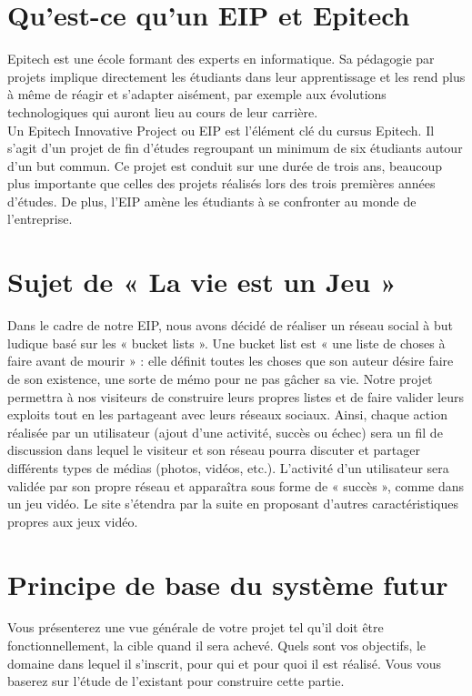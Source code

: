 \documentclass{life-fr}
\begin{document}
\section{Qu'est-ce qu'un EIP et Epitech}
Epitech est une école formant des experts en informatique. Sa pédagogie par projets implique directement les étudiants dans leur apprentissage et les rend plus à même de réagir et s'adapter aisément, par exemple aux évolutions technologiques qui auront lieu au cours de leur carrière.\\

Un Epitech Innovative Project ou EIP est l'élément clé du cursus Epitech. Il s'agit d'un projet de fin d'études regroupant un minimum de six étudiants autour d'un but commun. Ce projet est conduit sur une durée de trois ans, beaucoup plus importante que celles des projets réalisés lors des trois premières années d'études. De plus, l'EIP amène les étudiants à se confronter au monde de l'entreprise.

\section{Sujet de « La vie est un Jeu »}
Dans le cadre de notre EIP, nous avons décidé de réaliser un réseau social à but ludique basé sur les « bucket lists ». Une bucket list est « une liste de choses à faire avant de mourir » : elle définit toutes les choses que son auteur désire faire de son existence, une sorte de mémo pour ne pas gâcher sa vie. Notre projet permettra à nos visiteurs de construire leurs propres listes et de faire valider leurs exploits tout en les partageant avec leurs réseaux sociaux. Ainsi, chaque action réalisée par un utilisateur (ajout d'une activité, succès ou échec) sera un fil de discussion dans lequel le visiteur et son réseau pourra discuter et partager différents types de médias (photos, vidéos, etc.). L'activité d'un utilisateur sera validée par son propre réseau et apparaîtra sous forme de « succès », comme dans un jeu vidéo. Le site s'étendra par la suite en proposant d'autres caractéristiques propres aux jeux vidéo.

\section{Principe de base du système futur}

Vous présenterez une vue générale de votre projet tel qu’il doit être fonctionnellement, la cible quand il sera achevé. Quels sont vos objectifs, le domaine dans lequel il s’inscrit, pour qui et pour quoi il est réalisé. Vous vous baserez sur l’étude de l’existant pour construire cette partie.\\
\end{document}
